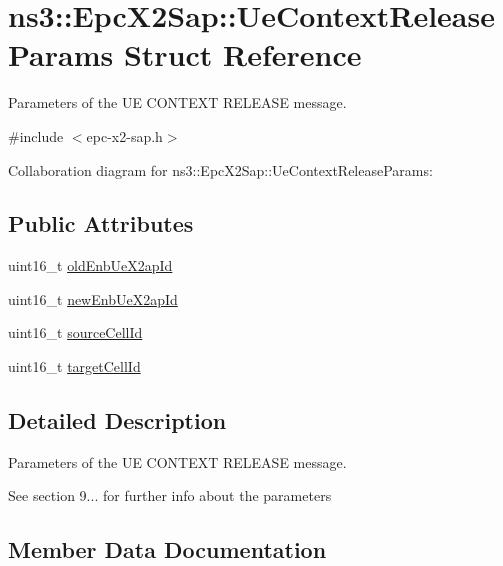 \hypertarget{structns3_1_1EpcX2Sap_1_1UeContextReleaseParams}{}\section{ns3\+:\+:Epc\+X2\+Sap\+:\+:Ue\+Context\+Release\+Params Struct Reference}
\label{structns3_1_1EpcX2Sap_1_1UeContextReleaseParams}


Parameters of the UE C\+O\+N\+T\+E\+XT R\+E\+L\+E\+A\+SE message.  




{\ttfamily \#include $<$epc-\/x2-\/sap.\+h$>$}



Collaboration diagram for ns3\+:\+:Epc\+X2\+Sap\+:\+:Ue\+Context\+Release\+Params\+:
\subsection*{Public Attributes}
\begin{DoxyCompactItemize}
\item 
uint16\+\_\+t \hyperlink{structns3_1_1EpcX2Sap_1_1UeContextReleaseParams_a86e4944fd9f5306ff9d5468443eb7fa1}{old\+Enb\+Ue\+X2ap\+Id}
\item 
uint16\+\_\+t \hyperlink{structns3_1_1EpcX2Sap_1_1UeContextReleaseParams_a210377e4ccfde3fed73c6e9ee1cae4f4}{new\+Enb\+Ue\+X2ap\+Id}
\item 
uint16\+\_\+t \hyperlink{structns3_1_1EpcX2Sap_1_1UeContextReleaseParams_af0861df06211af8b6158496f711423bc}{source\+Cell\+Id}
\item 
uint16\+\_\+t \hyperlink{structns3_1_1EpcX2Sap_1_1UeContextReleaseParams_af10d3411c400fcf90dce0120c18fa6ee}{target\+Cell\+Id}
\end{DoxyCompactItemize}


\subsection{Detailed Description}
Parameters of the UE C\+O\+N\+T\+E\+XT R\+E\+L\+E\+A\+SE message. 

See section 9... for further info about the parameters 

\subsection{Member Data Documentation}
